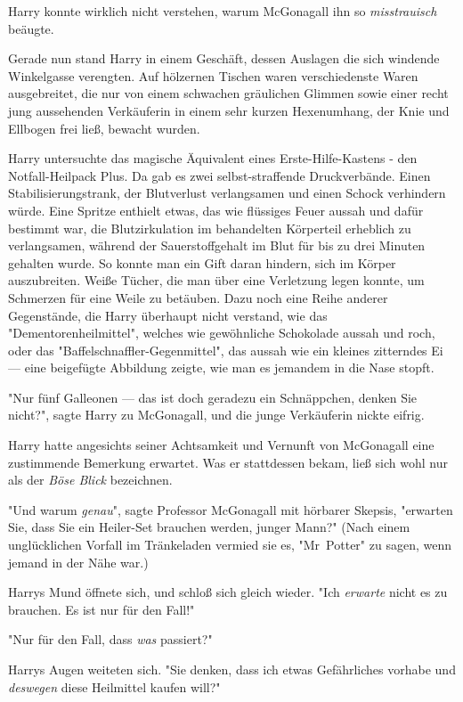 {Harry konnte wirklich nicht verstehen, warum McGonagall ihn so \emph{misstrauisch} beäugte.

Gerade nun stand Harry in einem Geschäft, dessen Auslagen die sich windende Winkelgasse verengten. Auf hölzernen Tischen waren verschiedenste Waren ausgebreitet, die nur von einem schwachen gräulichen Glimmen sowie einer recht jung aussehenden Verkäuferin in einem sehr kurzen Hexenumhang, der Knie und Ellbogen frei ließ, bewacht wurden.

Harry untersuchte das magische Äquivalent eines Erste-Hilfe-Kastens - den Notfall-Heilpack Plus. Da gab es zwei selbst-straffende Druckverbände. Einen Stabilisierungstrank, der Blutverlust verlangsamen und einen Schock verhindern würde. Eine Spritze enthielt etwas, das wie flüssiges Feuer aussah und dafür bestimmt war, die Blutzirkulation im behandelten Körperteil erheblich zu verlangsamen, während der Sauerstoffgehalt im Blut für bis zu drei Minuten gehalten wurde. So konnte man ein Gift daran hindern, sich im Körper auszubreiten. Weiße Tücher, die man über eine Verletzung legen konnte, um Schmerzen für eine Weile zu betäuben. Dazu noch eine Reihe anderer Gegenstände, die Harry überhaupt nicht verstand, wie das "Dementorenheilmittel", welches wie gewöhnliche Schokolade aussah und roch, oder das "Baffelschnaffler-Gegenmittel", das aussah wie ein kleines zitterndes Ei --- eine beigefügte Abbildung zeigte, wie man es jemandem in die Nase stopft.

"Nur fünf Galleonen --- das ist doch geradezu ein Schnäppchen, denken Sie nicht?", sagte Harry zu McGonagall, und die junge Verkäuferin nickte eifrig.

Harry hatte angesichts seiner Achtsamkeit und Vernunft von McGonagall eine zustimmende Bemerkung erwartet. Was er stattdessen bekam, ließ sich wohl nur als der \emph{Böse Blick} bezeichnen.

"Und warum \emph{genau}", sagte Professor McGonagall mit hörbarer Skepsis, "erwarten Sie, dass Sie ein Heiler-Set brauchen werden, junger Mann?" (Nach einem unglücklichen Vorfall im Tränkeladen vermied sie es, "Mr~Potter" zu sagen, wenn jemand in der Nähe war.)

Harrys Mund öffnete sich, und schloß sich gleich wieder. "Ich \emph{erwarte} nicht es zu brauchen. Es ist nur für den Fall!"

"Nur für den Fall, dass \emph{was} passiert?"

Harrys Augen weiteten sich. "Sie denken, dass ich etwas Gefährliches vorhabe und \emph{deswegen} diese Heilmittel kaufen will?"

}
